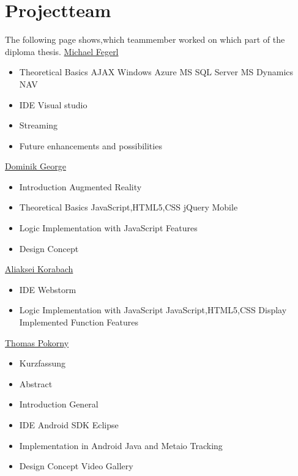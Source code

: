 

\chapter*{Projectteam}

 The following page shows,which teammember worked on which part of the diploma
 thesis.
\newline
\newline
 	\uline{Michael Fegerl}
	\begin{itemize}
	\item Theoretical Basics
	\subitem AJAX
	\subitem Windows Azure
	\subitem MS SQL Server
	\subitem MS Dynamics NAV
	\item IDE
	\subitem Visual studio
	\item Streaming
	\item Future enhancements and possibilities
	\end{itemize}
	
	 	\uline{Dominik George}
		\begin{itemize}
		\item Introduction
		\subitem Augmented Reality
		\item Theoretical Basics
		\subitem JavaScript,HTML5,CSS
		\subitem jQuery Mobile
		\item Logic Implementation with JavaScript
		\subitem Features
		\item Design Concept
		\end{itemize}
		
			\uline{Aliaksei Korabach}
				\begin{itemize}
				\item IDE
				\subitem Webstorm
				\item Logic Implementation with JavaScript
				\subitem JavaScript,HTML5,CSS
				\subitem Display
				\subitem Implemented Function
				\subitem Features
			

				\end{itemize}
				
			\uline{Thomas Pokorny}
					\begin{itemize}
					\item Kurzfassung
					\item Abstract
					\item Introduction
				    \subitem General
				    \item IDE
				    \subitem Android SDK Eclipse
				    \item Implementation in Android Java and Metaio Tracking 
				    \item Design Concept
				    \subitem Video Gallery
				
				
					\end{itemize}